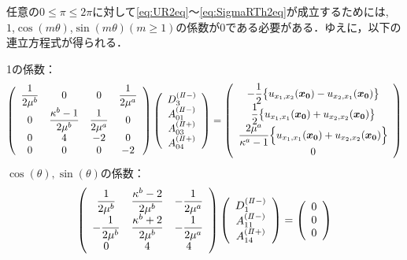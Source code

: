 
任意の$0\leq\pi\leq2\pi$に対して\eqref{eq:UR2eq}～\eqref{eq:SigmaRTh2eq}が成立するためには,\\
$1$,$\cos(m\theta)$,$\sin(m\theta)$$(m\geq1)$の係数が0である必要がある．ゆえに，以下の連立方程式が得られる．

1の係数：
\begin{align}
	\left(
	\begin{array}{cccc}
		{\displaystyle\frac{1}{2\mu^b}}& 0 & 0 & {\displaystyle\frac{1}{2\mu^a}} \\
		0 & {\displaystyle\frac{\kappa^b-1}{2\mu^b}} & {\displaystyle\frac{1}{2\mu^a}} & 0 \\
		0 & 4 & -2 & 0 \\
		0 & 0 & 0 & -2 \\
	\end{array}
	\right)
	\left(
	\begin{array}{c}
		D_{3}^{(I\hspace{-.15em}I-)} \\
	 	A_{01}^{(I\hspace{-.15em}I-)} \\
		A_{03}^{(I\hspace{-.15em}I+)}\\
	 	A_{04}^{(I\hspace{-.15em}I+)} \\
	\end{array}
	\right)
	=
	\left(
	\begin{array}{c}
	 	{\displaystyle-\frac{1}{2}\bigl\{u_{x_{1},x_{2}}(\bm{x_{0}})-u_{x_{2},x_{1}}(\bm{x_{0}})\bigr\}} \\
		{\displaystyle\frac{1}{2}\bigl\{u_{x_{1},x_{1}}(\bm{x_{0}})+u_{x_{2},x_{2}}(\bm{x_{0}})\bigr\}} \\
		{\displaystyle\frac{2\mu^a}{\kappa^a-1}\Bigl\{ u_{x_{1},x_{1}}(\bm{x_{0}})+ u_{x_{2},x_{2}}(\bm{x_{0}})\Bigr\}} \\
	 	0 \\
	\end{array}
	\right)
\end{align}
$\cos(\theta),\sin(\theta)$の係数：
\begin{align}
	\left(
	\begin{array}{ccc}
		{\displaystyle\frac{1}{2\mu^b}}& {\displaystyle\frac{\kappa^b-2}{2\mu^b}} & {\displaystyle-\frac{1}{2\mu^a}} \\
		{\displaystyle-\frac{1}{2\mu^b}} & {\displaystyle\frac{\kappa^b+2}{2\mu^b}} & {\displaystyle-\frac{1}{2\mu^a}} \\
		0 & 4 & 4 \\
	\end{array}
	\right)
	\left(
	\begin{array}{c}
		D_{1}^{(I\hspace{-.15em}I-)} \\
	 	A_{11}^{(I\hspace{-.15em}I-)} \\
	 	A_{14}^{(I\hspace{-.15em}I+)} \\
	\end{array}
	\right)
	=
	\left(
	\begin{array}{c}
		0 \\
	 	0 \\
	 	0 \\
	\end{array}
	\right)
\end{align}
